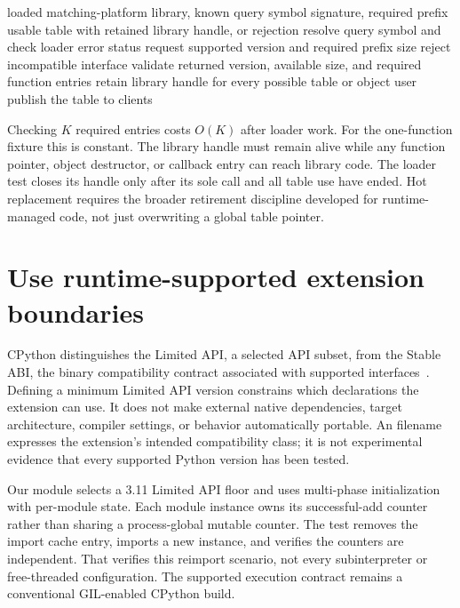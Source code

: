 \begin{algorithm}[htbp]
\caption{Negotiate a versioned native function-table contract.}
\label{alg:ch75-negotiate}
\begin{pseudocode}
\Require loaded matching-platform library, known query symbol signature, required prefix
\Ensure usable table with retained library handle, or rejection
\State resolve query symbol and check loader error status
\State request supported version and required prefix size
 \State reject incompatible interface \EndIf
\State validate returned version, available size, and required function entries
\State retain library handle for every possible table or object user
\State publish the table to clients
\end{pseudocode}
\end{algorithm}

Checking $K$ required entries costs $O(K)$ after loader work.
For the one-function fixture this is constant.
The library handle must remain alive while any function pointer, object destructor, or callback entry can reach library code.
The loader test closes its handle only after its sole call and all table use have ended.
Hot replacement requires the broader retirement discipline developed for runtime-managed code, not just overwriting a global table pointer.

\section{Use runtime-supported extension boundaries}
\label{sec:ch75-runtime}
CPython distinguishes the Limited API, a selected API subset, from the Stable ABI, the binary compatibility contract associated with supported interfaces~\cite{python-2026-capi}.
Defining a minimum Limited API version constrains which declarations the extension can use.
It does not make external native dependencies, target architecture, compiler settings, or behavior automatically portable.
An  filename expresses the extension's intended compatibility class; it is not experimental evidence that every supported Python version has been tested.

Our module selects a 3.11 Limited API floor and uses multi-phase initialization with per-module state.
Each module instance owns its successful-add counter rather than sharing a process-global mutable counter.
The test removes the import cache entry, imports a new instance, and verifies the counters are independent.
That verifies this reimport scenario, not every subinterpreter or free-threaded configuration.
The supported execution contract remains a conventional GIL-enabled CPython build.

